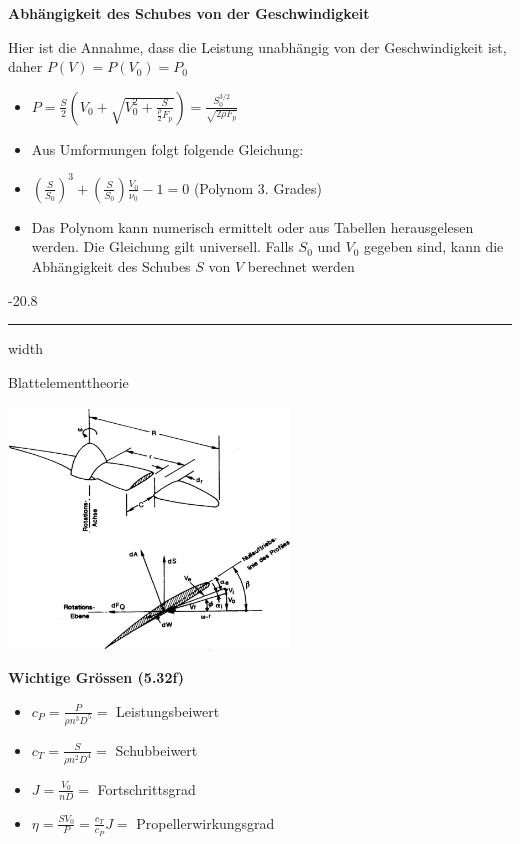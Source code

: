 \documentclass[8pt, landscape, fleqn]{scrartcl}
\makeatletter
\renewcommand{\subsubsection}{\@startsection{subsubsection}{1}{0mm}%
{-2\baselineskip}{0.8\baselineskip}%
{\hrule depth 0.2pt width\columnwidth\vspace*{1.2em}\normalsize\bfseries\rmfamily}}
\makeatother
\begin{document}
\begin{multicols*}{3}
\textbf{Abhängigkeit des Schubes von der Geschwindigkeit} \newline

Hier ist die Annahme, dass die Leistung unabhängig von der Geschwindigkeit ist, daher $P(V) = P(V_0) = P_0$

\begin{itemize}
    \item $P = \frac{S}{2}\left( V_0 + \sqrt{V_0^2 + \frac{S}{\frac{\rho}{2} F_p}}\right) = \frac{S_0^{3/2}}{\sqrt{2 \rho F_p}}$
    \item Aus Umformungen folgt folgende Gleichung:
    \item $\left( \frac{S}{S_0} \right)^3 + \left(\frac{S}{S_0} \right) \frac{V_0}{\nu_0} - 1 = 0$ (Polynom 3. Grades)
    \item Das Polynom kann numerisch ermittelt oder aus Tabellen herausgelesen werden. Die Gleichung gilt universell. Falls $S_0$ und $V_0$ gegeben sind, kann die Abhängigkeit des Schubes $S$ von $V$ berechnet werden
\end{itemize}

\subsubsection{Blattelementtheorie}

\begin{center}
    \includegraphics[width=7.5cm]{images/Blattelementtheorie_1.png}
\end{center}

\textbf{Wichtige Grössen (5.32f)}

\begin{itemize}
    \item $c_P = \frac{P}{\rho n^3 D^5} = $ Leistungsbeiwert
    \item $c_T = \frac{S}{\rho n^2 D^4} = $ Schubbeiwert
    \item $J = \frac{V_0}{n D} = $ Fortschrittsgrad
    \item $\eta = \frac{S V_0}{P} = \frac{c_T}{c_P} J = $ Propellerwirkungsgrad
\end{itemize}


\end{multicols*}
\end{document}
